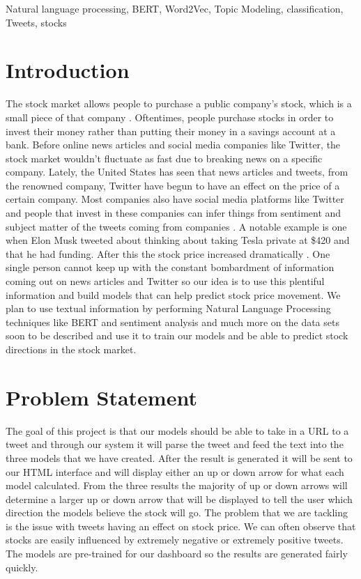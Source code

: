 \documentclass[conference]{IEEEtran}
\begin{document}
\begin{IEEEkeywords}
    Natural language processing, BERT, Word2Vec, Topic Modeling, classification, Tweets, stocks
\end{IEEEkeywords}

\section{Introduction}
The stock market allows people to purchase a public company’s stock, which is a small piece of that company \cite{b2}. Oftentimes, people purchase stocks in order to invest their money rather than putting their money in a savings account at a bank. Before online news articles and social media companies like Twitter, the stock market wouldn’t fluctuate as fast due to breaking news on a specific company. Lately, the United States has seen that news articles and tweets, from the renowned company, Twitter have begun to have an effect on the price of a certain company. Most companies also have social media platforms like Twitter and people that invest in these companies can infer things from sentiment and subject matter of the tweets coming from companies \cite{b6}. A notable example is one when Elon Musk tweeted about thinking about taking Tesla private at \$420 and that he had funding. After this the stock price increased dramatically \cite{b4}. One single person cannot keep up with the constant bombardment of information coming out on news articles and Twitter so our idea is to use this plentiful information and build models that can help predict stock price movement. We plan to use textual information by performing Natural Language Processing techniques like BERT and sentiment analysis and much more on the data sets soon to be described and use it to train our models and be able to predict stock directions in the stock market.

\section{Problem Statement}
The goal of this project is that our models should be able to take in a URL to a tweet and through our system it will parse the tweet and feed the text into the three models that we have created. After the result is generated it will be sent to our HTML interface and will display either an up or down arrow for what each model calculated. From the three results the majority of up or down arrows will determine a larger up or down arrow that will be displayed to tell the user which direction the models believe the stock will go. The problem that we are tackling is the issue with tweets having an effect on stock price. We can often observe that stocks are easily influenced by extremely negative or extremely positive tweets. The models are pre-trained for our dashboard so the results are generated fairly quickly.
\end{document}
